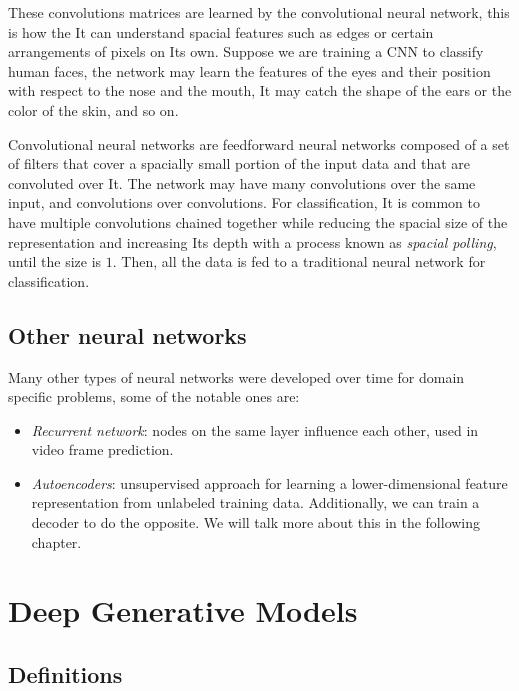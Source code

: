 \documentclass{article}
\begin{document}
These convolutions matrices are learned by the convolutional neural
network, this is how the It can understand spacial features such as
edges or certain arrangements of pixels on Its own. Suppose we are
training a CNN to classify human faces, the network may learn the
features of the eyes and their position with respect to the nose and the
mouth, It may catch the shape of the ears or the color of the skin, and
so on.

Convolutional neural networks are feedforward neural networks composed
of a set of filters that cover a spacially small portion of the input
data and that are convoluted over It. The network may have many
convolutions over the same input, and convolutions over convolutions.
For classification, It is common to have multiple convolutions chained
together while reducing the spacial size of the representation and
increasing Its depth with a process known as \emph{spacial polling},
until the size is \(1\). Then, all the data is fed to a traditional
neural network for classification.

\subsection{Other neural networks}\label{other-neural-networks}

Many other types of neural networks were developed over time for domain
specific problems, some of the notable ones are:

\begin{itemize}
\tightlist
\item
  \emph{Recurrent network}: nodes on the same layer influence each
  other, used in video frame prediction.
\item
  \emph{Autoencoders}: unsupervised approach for learning a
  lower-dimensional feature representation from unlabeled training data.
  Additionally, we can train a decoder to do the opposite. We will talk
  more about this in the following chapter.
\end{itemize}

\section{Deep Generative Models}\label{deep-generative-models}

\subsection{Definitions}\label{definitions}
\end{document}
